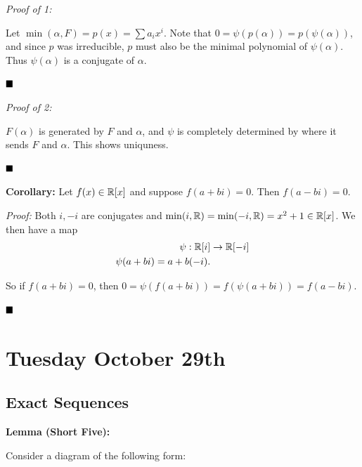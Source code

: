 \emph{Proof of 1:}

Let \(\min(\alpha, F) = p(x) = \sum a_i x^i\). Note that
\(0 = \psi(p(\alpha)) = p(\psi(\alpha))\), and since \(p\) was
irreducible, \(p\) must also be the minimal polynomial of
\(\psi(\alpha)\). Thus \(\psi(\alpha)\) is a conjugate of \(\alpha\).

\(\qed\)

\emph{Proof of 2:}

\(F(\alpha)\) is generated by \(F\) and \(\alpha\), and \(\psi\) is
completely determined by where it sends \(F\) and \(\alpha\). This shows
uniquness.

\(\qed\)

\textbf{Corollary:} Let \(f(x) \in {\mathbb{R}}[x]\) and suppose \(f(a+bi)= 0\).
Then \(f(a-bi) = 0\).

\emph{Proof:} Both \(i, -i\) are conjugates and
\(\min(i, {\mathbb{R}}) = \min(-i, {\mathbb{R}}) = x^2 + 1 \in {\mathbb{R}}[x]\). We then have a
map \begin{align*}
\psi: {\mathbb{R}}[i] &\to {\mathbb{R}}[-i] \\
\psi(a+bi) = a + b(-i)
.\end{align*}

So if \(f(a+bi) = 0\), then
\(0 = \psi(f(a+bi)) = f(\psi(a+bi)) = f(a-bi)\).

\(\qed\)

\hypertarget{tuesday-october-29th}{%
\section{Tuesday October 29th}\label{tuesday-october-29th}}

\hypertarget{exact-sequences}{%
\subsection{Exact Sequences}\label{exact-sequences}}

\textbf{Lemma (Short Five):}

Consider a diagram of the following form:


